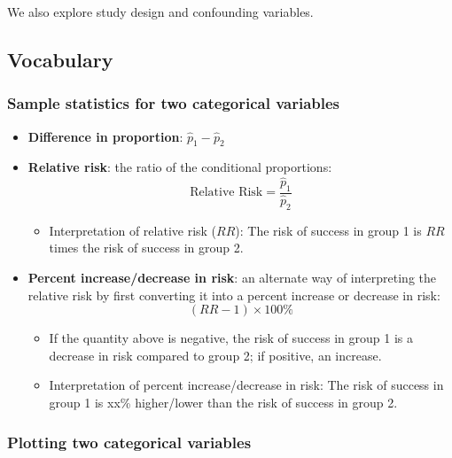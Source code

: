 \documentclass[
]{report}
\providecommand{\tightlist}{%
  \setlength{\itemsep}{0pt}\setlength{\parskip}{0pt}}
\begin{document}
We also explore study design and confounding variables.

\subsection{Vocabulary}\label{vocabulary-6}

\subsubsection*{Sample statistics for two categorical variables}\label{sample-statistics-for-two-categorical-variables}

\begin{itemize}
\item
  \textbf{Difference in proportion}: \(\hat{p}_1 - \hat{p}_2\)
\item
  \textbf{Relative risk}: the ratio of the conditional proportions:
  \[\text{Relative Risk} = \frac{\hat{p}_1}{\hat{p}_2}\]

  \begin{itemize}
  \tightlist
  \item
    Interpretation of relative risk (\(RR\)): The risk of success in group 1 is \(RR\) times the risk of success in group 2.
  \end{itemize}
\item
  \textbf{Percent increase/decrease in risk}: an alternate way of interpreting the relative risk by first converting it into a percent increase or decrease in risk:
  \[(RR-1) \times 100\%\]

  \begin{itemize}
  \tightlist
  \item
    If the quantity above is negative, the risk of success in group 1 is a decrease in risk compared to group 2; if positive, an increase.\\
  \item
    Interpretation of percent increase/decrease in risk: The risk of success in group 1 is xx\% higher/lower than the risk of success in group 2.
  \end{itemize}
\end{itemize}

\subsubsection*{Plotting two categorical variables}\label{plotting-two-categorical-variables}
\end{document}
